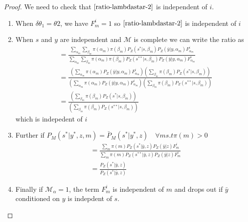 \documentclass[12pt]{article}
\newtheorem*{proof}{Proof}
\begin{document}
\begin{proof}
We need to check that $\ref{ratio-lambdastar-2}$ is independent of $i$. 
\begin{enumerate}
	\item When  $\delta\theta_1=\theta2$, we have $F^i_m=1$ so $\ref{ratio-lambdastar-2}$ is independent of $i$
	\item When $s$ and $y$ are independent and $\mathcal{M}$ is complete we can write the ratio as
	\begin{align}
&=\frac{
\sum_{\alpha_m}\sum_{\beta_m}\pi(\alpha_m)\pi(\beta_m)P_Z(s^*|s,\beta_m)P_Z(\bar{y}|y,\alpha_m)F^i_{\alpha_m
}
}
{\sum_{\alpha_m}\sum_{\beta_m}\pi(\alpha_m)\pi(\beta_m)P_Z(s^{**}|s,\beta_m)P_Z(\bar{y}|y,\alpha_m)F^i_{\alpha_m
}
}\\
&=\frac{
\left(\sum_{\alpha_m}\pi(\alpha_m)P_Z(\bar{y}|y,\alpha_m)F^i_{\alpha_m
}\right)\left(\sum_{\beta_m} \pi(\beta_m)P_Z(s^*|s,\beta_m)\right)
}
{
\left(\sum_{\alpha_m}\pi(\alpha_m)P_Z(\bar{y}|y,\alpha_m)F^i_{\alpha_m
}\right)\left(\sum_{\beta_m} \pi(\beta_m)P_Z(s^{**}|s,\beta_m)\right)
}\\
&=\frac{
\left(\sum_{\beta_m} \pi(\beta_m)P_Z(s^*|s,\beta_m)\right)
}
{
\left(\sum_{\beta_m} \pi(\beta_m)P_Z(s^{**}|s,\beta_m)\right)
}
\end{align}
which is indepedent of $i$
\item Further if  $P_M(s^*|y^*,z,m)=\bar{P}_M(s^*|y^*,z) \quad \forall m s.t \pi(m) >0$   
\begin{align}
&=\frac{\sum_{m}\pi(m)P_Z(s^*|\bar{y},z)P_Z(\bar{y}|z)F^i_m
}
{\sum_{m}\pi(m)P_Z(s^{**}|\bar{y},z)P_Z(\bar{y}|z)F^i_m
}\\
&=\frac{P_Z(s^*|\bar{y},z)}
{
P_Z(s^*|\bar{y},z)
}
\end{align}

\item Finally if $\mathcal{M}_{\alpha}=1$, the term $F^i_m$ is independent of $m$ and drops out if $\bar{y}$ conditioned on $y$ is indepdent of $s$.

\end{enumerate}


\end{proof}







 
\end{document}

